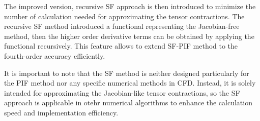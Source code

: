 The improved version, recursive SF approach is then introduced to minimize
the number of calculation needed for approximating the tensor contractions.
The recursive SF method introduced a functional representing the Jacobian-free method,
then the higher order derivative terms can be obtained by applying the functional recursively.
This feature allows to extend SF-PIF method to the fourth-order accuracy efficiently.

It is important to note that the SF method is neither designed particularly for the PIF method
nor any specific numerical methods in CFD.
Instead, it is solely intended for approximating the Jacobian-like tensor contractions,
so the SF approach is applicable in otehr numerical algorithms
to enhance the calculation speed and implementation efficiency.
